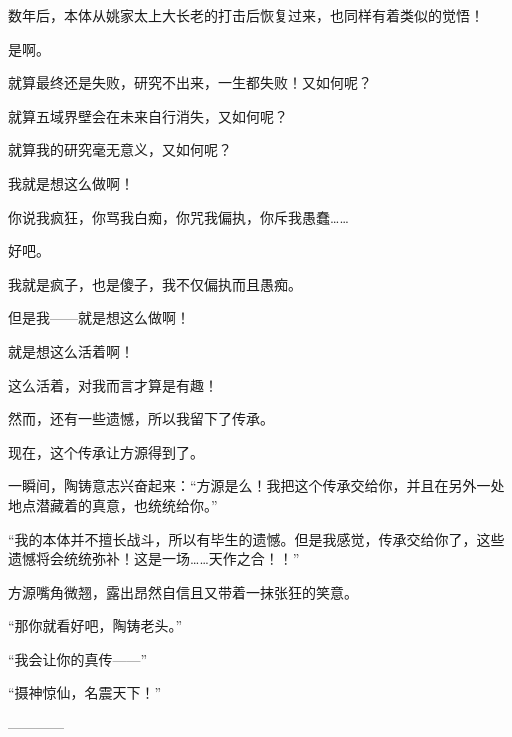 \begin{this_body}
数年后，本体从姚家太上大长老的打击后恢复过来，也同样有着类似的觉悟！

是啊。

就算最终还是失败，研究不出来，一生都失败！又如何呢？

就算五域界壁会在未来自行消失，又如何呢？

就算我的研究毫无意义，又如何呢？

我就是想这么做啊！

你说我疯狂，你骂我白痴，你咒我偏执，你斥我愚蠢……

好吧。

我就是疯子，也是傻子，我不仅偏执而且愚痴。

但是我——就是想这么做啊！

就是想这么活着啊！

这么活着，对我而言才算是有趣！

然而，还有一些遗憾，所以我留下了传承。

现在，这个传承让方源得到了。

一瞬间，陶铸意志兴奋起来：“方源是么！我把这个传承交给你，并且在另外一处地点潜藏着的真意，也统统给你。”

“我的本体并不擅长战斗，所以有毕生的遗憾。但是我感觉，传承交给你了，这些遗憾将会统统弥补！这是一场……天作之合！！”

方源嘴角微翘，露出昂然自信且又带着一抹张狂的笑意。

“那你就看好吧，陶铸老头。”

“我会让你的真传——”

“摄神惊仙，名震天下！”

------------

\end{this_body}

